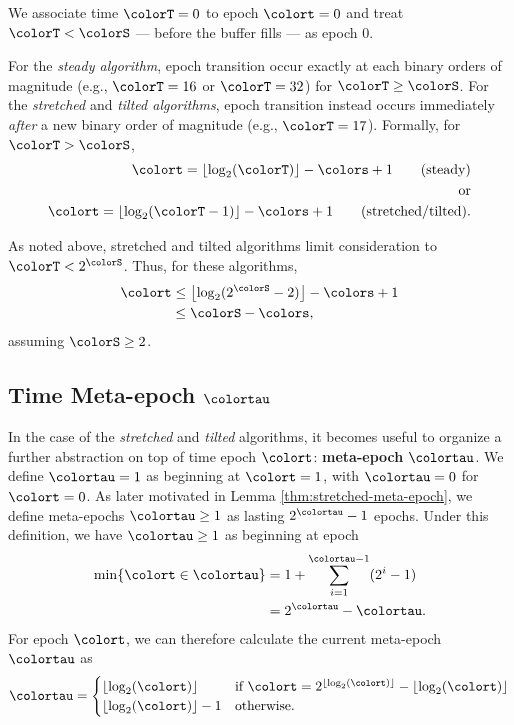 We associate time $\colorT=0$ to epoch $\colort=0$ and treat $\colorT < \colorS$ --- before the buffer fills --- as epoch 0.

For the \textit{steady algorithm}, epoch transition occur exactly at each binary orders of magnitude (e.g., $\colorT = 16$ or $\colorT = 32$) for $\colorT \geq \colorS$.
For the \textit{stretched} and \textit{tilted algorithms}, epoch transition instead occurs immediately \textit{after} a new binary order of magnitude (e.g.,  $\colorT = 17$).
Formally, for $\colorT > \colorS$,
\begin{align*}
\colort = \left\lfloor \log_2(\colorT) \right\rfloor - \colors + 1 \tag{steady}\\
\text{or}\\
\colort = \left\lfloor \log_2(\colorT - 1) \right\rfloor - \colors + 1 \tag{stretched/tilted}.
\end{align*}

As noted above, stretched and tilted algorithms limit consideration to $\colorT < 2^{\colorS}$.
Thus, for these algorithms,
\begin{align*}
\colort &\leq \left\lfloor\log_2(2^{\colorS} - 2)\right\rfloor - \colors + 1 \\
&\leq \colorS - \colors,
\end{align*}
assuming $\colorS \geq 2$.

\subsection{Time Meta-epoch $\colortau$}
\label{sec:notation-metaepoch}

In the case of the \textit{stretched} and \textit{tilted} algorithms, it becomes useful to organize a further abstraction on top of time epoch $\colort$: \textbf{meta-epoch} $\colortau$.
We define $\colortau=1$ as beginning at $\colort = 1$, with $\colortau=0$ for $\colort=0$.
As later motivated in Lemma \ref{thm:stretched-meta-epoch}, we define meta-epochs $\colortau\geq1$ as lasting $2^{\colortau} - 1$ epochs.
Under this definition, we have $\colortau\geq1$ as beginning at epoch
\begin{align*}
\min\{\colort \in \colortau\}
&= 1 + \sum_{i=1}^{\colortau - 1} (2^{i} - 1) \\
&= 2^{\colortau} - \colortau.
\end{align*}
For epoch $\colort$, we can therefore calculate the current meta-epoch $\colortau$ as
\begin{align*}
\colortau
=
\begin{cases}
\left\lfloor \log_2(\colort) \right\rfloor & \text{if } \colort = 2^{\left\lfloor \log_2(\colort) \right\rfloor} - \left\lfloor \log_2(\colort) \right\rfloor \\
\left\lfloor \log_2(\colort) \right\rfloor - 1 & \text{otherwise.}
\end{cases}
\end{align*}

